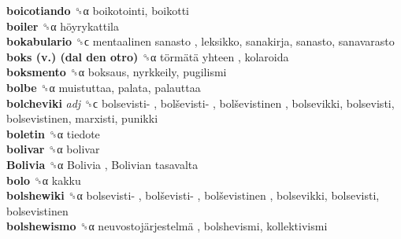 \textbf{boicotiando} ␝α  boikotointi, boikotti  \\
\textbf{boiler} ␝α   höyrykattila   \\
\textbf{bokabulario} ␝ϲ   mentaalinen sanasto , leksikko, sanakirja, sanasto, sanavarasto  \\
\textbf{boks (v.) (dal den otro)} ␝α   törmätä yhteen , kolaroida  \\
\textbf{boksmento} ␝α  boksaus, nyrkkeily, pugilismi  \\
\textbf{bolbe} ␝α  muistuttaa, palata, palauttaa  \\
\textbf{bolcheviki} \emph{adj}  ␝ϲ   bolsevisti- ,  bolševisti- ,  bolševistinen , bolsevikki, bolsevisti, bolsevistinen, marxisti, punikki  \\
\textbf{boletin} ␝α  tiedote  \\
\textbf{bolivar} ␝α  bolivar  \\
\textbf{Bolivia} ␝α   Bolivia ,  Bolivian tasavalta   \\
\textbf{bolo} ␝α  kakku  \\
\textbf{bolshewiki} ␝α   bolsevisti- ,  bolševisti- ,  bolševistinen , bolsevikki, bolsevisti, bolsevistinen  \\
\textbf{bolshewismo} ␝α   neuvostojärjestelmä , bolshevismi, kollektivismi  \\
